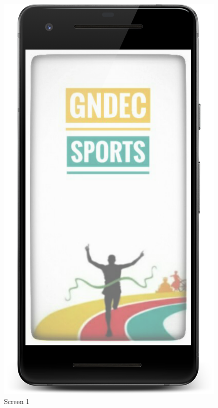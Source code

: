 \begin{figure}[ht]
\centering
\includegraphics[scale=0.06]{images/S1.png}
\caption{Screen 1}
\end{figure}

\newpage

